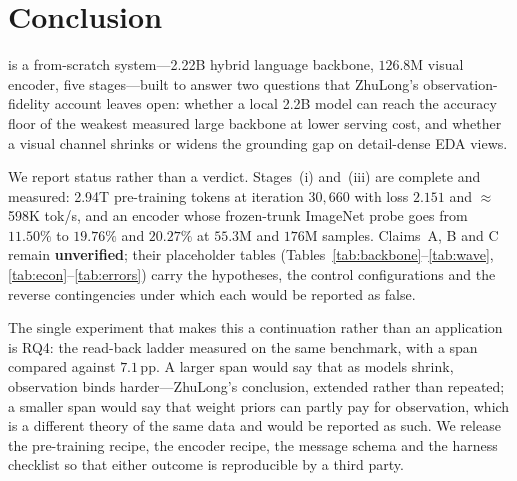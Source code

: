 ﻿\section{Conclusion}\label{sec:conclusion}

\llm is a from-scratch system---2.22B hybrid language backbone, $126.8$M visual encoder, five stages---built to answer two questions that ZhuLong's observation-fidelity account leaves open: whether a local 2.2B model can reach the accuracy floor of the weakest measured large backbone at lower serving cost, and whether a visual channel shrinks or widens the grounding gap on detail-dense EDA views.

We report status rather than a verdict.
Stages~(i) and~(iii) are complete and measured: 2.94T pre-training tokens at iteration $30{,}660$ with loss $2.151$ and $\approx$598K tok/s, and an encoder whose frozen-trunk ImageNet probe goes from $11.50\%$ to $19.76\%$ and $20.27\%$ at $55.3$M and $176$M samples.
Claims~A, B and C remain \textbf{unverified}; their placeholder tables (Tables~\ref{tab:backbone}--\ref{tab:wave}, \ref{tab:econ}--\ref{tab:errors}) carry the hypotheses, the control configurations and the reverse contingencies under which each would be reported as false.

The single experiment that makes this a continuation rather than an application is RQ4: the read-back ladder measured on the same benchmark, with a span compared against $7.1$\,pp.
A larger span would say that as models shrink, observation binds harder---ZhuLong's conclusion, extended rather than repeated; a smaller span would say that weight priors can partly pay for observation, which is a different theory of the same data and would be reported as such.
We release the pre-training recipe, the encoder recipe, the message schema and the harness checklist so that either outcome is reproducible by a third party.
